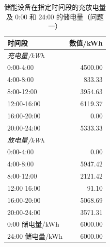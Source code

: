 \begin{table}[H]
\centering
{}
\begin{tabular}{lr}
\toprule
时间段 & 数值/kWh \\
\midrule
\multicolumn{2}{l}{\textit{充电量/kWh}} \\
0:00-4:00 & 4500.00 \\
4:00-8:00 & 833.33 \\
8:00-12:00 & 3954.63 \\
12:00-16:00 & 6119.37 \\
16:00-20:00 & 0.00 \\
20:00-24:00 & 5333.33 \\
\midrule
\multicolumn{2}{l}{\textit{放电量/kWh}} \\
0:00-4:00 & 0.00 \\
4:00-8:00 & 5947.42 \\
8:00-12:00 & 2121.42 \\
12:00-16:00 & 91.10 \\
16:00-20:00 & 5068.69 \\
20:00-24:00 & 3571.31 \\
\midrule
0:00 储电量/kWh & 6000.00 \\
24:00 储电量/kWh & 6000.00 \\
\bottomrule
\end{tabular}
\caption{储能设备在指定时间段的充放电量及 0:00 和 24:00 的储电量（问题一）}
\label{tab:m2-q1}
\end{table}
\par{}

